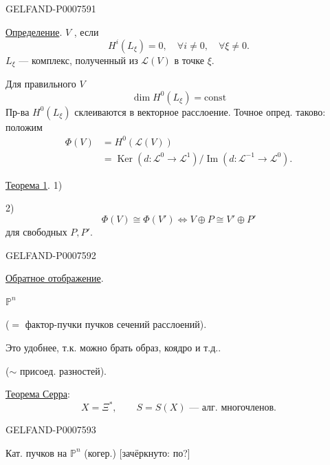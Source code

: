 \begin{GelfandAdjacentEvidence}{GELFAND-P000759}{1}

\underline{Определение}. \(V\) , если
\[
H^i(L_\xi)=0,\quad\forall i\ne0,\quad\forall\xi\ne0.
\]
\(L_\xi\) --- комплекс, полученный из \(\mathcal L(V)\) в точке \(\xi\).

Для правильного \(V\)
\[
\dim H^0(L_\xi)=\mathrm{const}
\]
Пр-ва \(H^0(L_\xi)\) склеиваются в векторное расслоение.
Точное опред. таково: положим
\[
\begin{aligned}
\Phi(V)&=H^0(\mathcal L(V))\\
&=\operatorname{Ker}(d:\mathcal L^0\to\mathcal L^1)
\big/\operatorname{Im}(d:\mathcal L^{-1}\to\mathcal L^0).
\end{aligned}
\]

\underline{Теорема 1}.
1) 

2)
\[
\Phi(V)\cong\Phi(V')\Longleftrightarrow
V\oplus P\cong V'\oplus P'
\]
для свободных \(P,P'\).
\end{GelfandAdjacentEvidence}
\begin{GelfandAdjacentEvidence}{GELFAND-P000759}{2}


\underline{Обратное отображение}.

 \(\mathbb P^n\)

(\(=\) фактор-пучки пучков сечений расслоений).

Это удобнее, т.к. можно брать образ, коядро и т.д..

(\(\sim\) присоед. разностей).

\underline{Теорема Серра}:
\[
X=\Xi^*,\qquad S=S(X)\text{ --- алг. многочленов.}
\]
\end{GelfandAdjacentEvidence}
\begin{GelfandAdjacentEvidence}{GELFAND-P000759}{3}


Кат. пучков на \(\mathbb P^n\) (когер.)
[зачёркнуто: по?]
\end{GelfandAdjacentEvidence}
